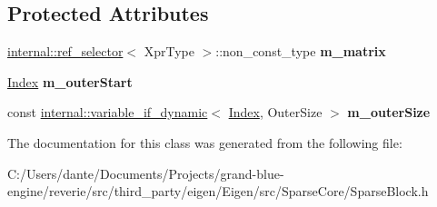 \subsection*{Protected Attributes}
\begin{DoxyCompactItemize}
\item 
\mbox{\label{class_eigen_1_1_block_impl_3_01_xpr_type_00_01_block_rows_00_01_block_cols_00_01true_00_01_sparse_01_4_a6e18c50a424065ac274db7c80e1c8093}} 
\mbox{\hyperlink{struct_eigen_1_1internal_1_1ref__selector}{internal\+::ref\+\_\+selector}}$<$ Xpr\+Type $>$\+::non\+\_\+const\+\_\+type {\bfseries m\+\_\+matrix}
\item 
\mbox{\label{class_eigen_1_1_block_impl_3_01_xpr_type_00_01_block_rows_00_01_block_cols_00_01true_00_01_sparse_01_4_a3938dc4edb0eba663df891828d5fe30d}} 
\mbox{\hyperlink{struct_eigen_1_1_eigen_base_a554f30542cc2316add4b1ea0a492ff02}{Index}} {\bfseries m\+\_\+outer\+Start}
\item 
\mbox{\label{class_eigen_1_1_block_impl_3_01_xpr_type_00_01_block_rows_00_01_block_cols_00_01true_00_01_sparse_01_4_a6525976971d94e822a9942ad4e7214c2}} 
const \mbox{\hyperlink{class_eigen_1_1internal_1_1variable__if__dynamic}{internal\+::variable\+\_\+if\+\_\+dynamic}}$<$ \mbox{\hyperlink{struct_eigen_1_1_eigen_base_a554f30542cc2316add4b1ea0a492ff02}{Index}}, Outer\+Size $>$ {\bfseries m\+\_\+outer\+Size}
\end{DoxyCompactItemize}


The documentation for this class was generated from the following file\+:\begin{DoxyCompactItemize}
\item 
C\+:/\+Users/dante/\+Documents/\+Projects/grand-\/blue-\/engine/reverie/src/third\+\_\+party/eigen/\+Eigen/src/\+Sparse\+Core/Sparse\+Block.\+h\end{DoxyCompactItemize}
